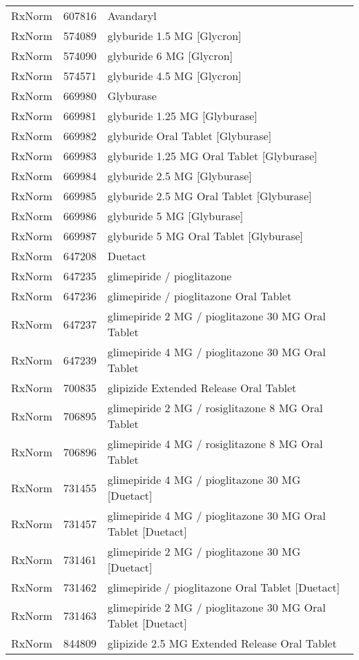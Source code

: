 \begin{longtable}{p{}p{}p{}}
  RxNorm & 607816 & Avandaryl \\ 
  RxNorm & 574089 & glyburide 1.5 MG [Glycron] \\ 
  RxNorm & 574090 & glyburide 6 MG [Glycron] \\ 
  RxNorm & 574571 & glyburide 4.5 MG [Glycron] \\ 
  RxNorm & 669980 & Glyburase \\ 
  RxNorm & 669981 & glyburide 1.25 MG [Glyburase] \\ 
  RxNorm & 669982 & glyburide Oral Tablet [Glyburase] \\ 
  RxNorm & 669983 & glyburide 1.25 MG Oral Tablet [Glyburase] \\ 
  RxNorm & 669984 & glyburide 2.5 MG [Glyburase] \\ 
  RxNorm & 669985 & glyburide 2.5 MG Oral Tablet [Glyburase] \\ 
  RxNorm & 669986 & glyburide 5 MG [Glyburase] \\ 
  RxNorm & 669987 & glyburide 5 MG Oral Tablet [Glyburase] \\ 
  RxNorm & 647208 & Duetact \\ 
  RxNorm & 647235 & glimepiride / pioglitazone \\ 
  RxNorm & 647236 & glimepiride / pioglitazone Oral Tablet \\ 
  RxNorm & 647237 & glimepiride 2 MG / pioglitazone 30 MG Oral Tablet \\ 
  RxNorm & 647239 & glimepiride 4 MG / pioglitazone 30 MG Oral Tablet \\ 
  RxNorm & 700835 & glipizide Extended Release Oral Tablet \\ 
  RxNorm & 706895 & glimepiride 2 MG / rosiglitazone 8 MG Oral Tablet \\ 
  RxNorm & 706896 & glimepiride 4 MG / rosiglitazone 8 MG Oral Tablet \\ 
  RxNorm & 731455 & glimepiride 4 MG / pioglitazone 30 MG [Duetact] \\ 
  RxNorm & 731457 & glimepiride 4 MG / pioglitazone 30 MG Oral Tablet [Duetact] \\ 
  RxNorm & 731461 & glimepiride 2 MG / pioglitazone 30 MG [Duetact] \\ 
  RxNorm & 731462 & glimepiride / pioglitazone Oral Tablet [Duetact] \\ 
  RxNorm & 731463 & glimepiride 2 MG / pioglitazone 30 MG Oral Tablet [Duetact] \\ 
  RxNorm & 844809 & glipizide 2.5 MG Extended Release Oral Tablet \\ 

\end{longtable}
